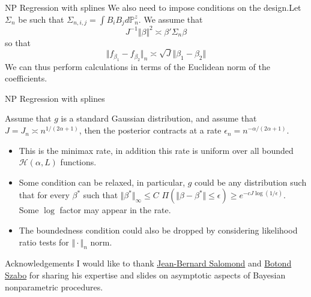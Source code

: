 \begin{frame}{NP Regression with splines}
We also need to impose conditions on the design.\pause Let $\Sigma_n$ be such that $\Sigma_{n,i,j} = \int B_i B_j d\mathbb{P}_n^z$. We assume that 
$$
J^{-1} \Vert \beta\Vert^2 \asymp \beta' \Sigma_n \beta   
$$ 
so that 
$$
\Vert f_{\beta_1} - f_{\beta_2} \Vert_n \asymp \sqrt{J} \Vert \beta_1 - \beta_2 \Vert
$$
\pause
We can thus perform calculations in terms of the Euclidean norm of the coefficients.
\end{frame}

\begin{frame}{NP Regression with splines}
\begin{theorem}
Assume that $g$ is a standard Gaussian distribution, and assume that $J = J_n \asymp n^{1/(2\alpha + 1)}$, then the posterior contracts at a rate $\epsilon_n = n^{-\alpha/(2\alpha + 1)}$. 
\end{theorem}
\pause 
\begin{itemize}[<+->]
\item This is the minimax rate, in addition this rate is uniform over all bounded $\mathcal{H}(\alpha,L)$ functions. 
\item Some condition can be relaxed, in particular, $g$ could be any distribution such that for every $\beta^*$ such that $\Vert \beta^*\Vert_\infty \leq C$ $\Pi(\Vert \beta - \beta^* \Vert \leq \epsilon) \geq e^{-c J \log(1/\epsilon)}$. Some $\log$ factor may appear in the rate.
\item The boundedness condition could also be dropped by considering likelihood ratio tests for $\Vert \cdot \Vert_n$ norm. 
\end{itemize}
\end{frame}

\begin{frame}{Acknowledgements}
I would like to thank \href{https://sites.google.com/site/jbsalomond/}{Jean-Bernard Salomond} and \href{https://botondszabo.com/}{Botond Szabo} for sharing his expertise and slides on asymptotic aspects of Bayesian nonparametric procedures.
	
\end{frame}

